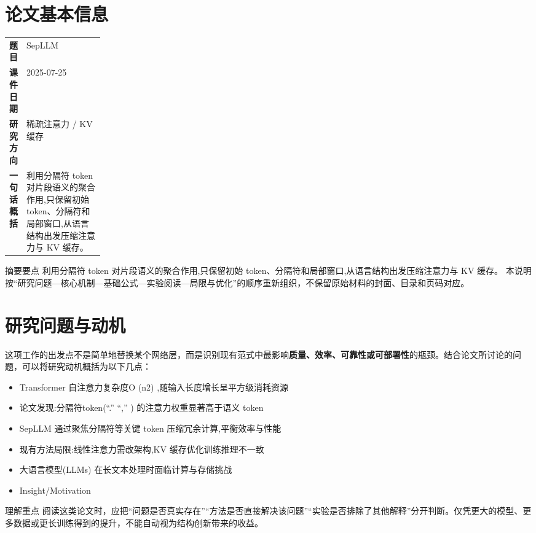 \documentclass[UTF8,11pt,a4paper]{ctexart}
\newcommand{\term}[1]{\textbf{\textcolor{mainblue}{#1}}}
\begin{document}
\section{论文基本信息}
\begin{center}
\begin{tabularx}{0.94\linewidth}{>{\bfseries}p{0.18\linewidth}X}
\toprule
题目 & SepLLM\\
课件日期 & 2025-07-25\\
研究方向 & 稀疏注意力 / KV 缓存\\
一句话概括 & 利用分隔符 token 对片段语义的聚合作用,只保留初始 token、分隔符和局部窗口,从语言结构出发压缩注意力与 KV 缓存。\\
\bottomrule
\end{tabularx}
\end{center}

\begin{infobox}{摘要要点}
利用分隔符 token 对片段语义的聚合作用,只保留初始 token、分隔符和局部窗口,从语言结构出发压缩注意力与 KV 缓存。 本说明按“研究问题—核心机制—基础公式—实验阅读—局限与优化”的顺序重新组织，不保留原始材料的封面、目录和页码对应。
\end{infobox}

\section{研究问题与动机}
这项工作的出发点不是简单地替换某个网络层，而是识别现有范式中最影响\term{质量、效率、可靠性或可部署性}的瓶颈。结合论文所讨论的问题，可以将研究动机概括为以下几点：
\begin{itemize}
\item Transformer 自注意力复杂度O (n2) ,随输入长度增长呈平方级消耗资源
\item 论文发现:分隔符token(“.” “,” ) 的注意力权重显著高于语义 token
\item SepLLM 通过聚焦分隔符等关键 token 压缩冗余计算,平衡效率与性能
\item 现有方法局限:线性注意力需改架构,KV 缓存优化训练推理不一致
\item 大语言模型(LLMs) 在长文本处理时面临计算与存储挑战
\item Insight/Motivation
\end{itemize}

\begin{notebox}{理解重点}
阅读这类论文时，应把“问题是否真实存在”“方法是否直接解决该问题”“实验是否排除了其他解释”分开判断。仅凭更大的模型、更多数据或更长训练得到的提升，不能自动视为结构创新带来的收益。
\end{notebox}
\end{document}
